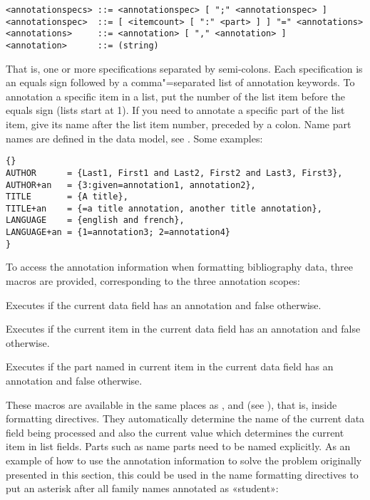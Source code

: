 \documentclass{ltxdockit}[2011/03/25]
\begin{document}
\begin{lstlisting}
<annotationspecs> ::= <annotationspec> [ ";" <annotationspec> ]
<annotationspec>  ::= [ <itemcount> [ ":" <part> ] ] "=" <annotations>
<annotations>     ::= <annotation> [ "," <annotation> ]
<annotation>      ::= (string)
\end{lstlisting}
%
That is, one or more specifications separated by semi-colons. Each specification is an equals sign followed by a comma"=separated list of annotation keywords. To annotation a specific item in a list, put the number of the list item before the equals sign (lists start at 1). If you need to annotate a specific part of the list item, give its name after the list item number, preceded by a colon. Name part names are defined in the data model, see . Some examples:

\begin{lstlisting}[style=bibtex]{}
AUTHOR      = {Last1, First1 and Last2, First2 and Last3, First3},
AUTHOR+an   = {3:given=annotation1, annotation2},
TITLE       = {A title},
TITLE+an    = {=a title annotation, another title annotation},
LANGUAGE    = {english and french},
LANGUAGE+an = {1=annotation3; 2=annotation4}
}
\end{lstlisting}
%
To access the annotation information when formatting bibliography data, three macros are provided, corresponding to the three annotation scopes:

\begin{ltxsyntax}


Executes  if the current data field has an annotation  and false otherwise.


Executes  if the current item in the current data field has an annotation  and false otherwise.


Executes  if the part named  in current item in the current data field has an annotation  and false otherwise.

\end{ltxsyntax}
%
These macros are available in the same places as ,  and  (see ), that is, inside formatting directives. They automatically determine the name of the current data field being processed and also the current  value which determines the current item in list fields. Parts such as name parts need to be named explicitly. As an example of how to use the annotation information to solve the problem originally presented in this section, this could be used in the name formatting directives to put an asterisk after all family names annotated as «student»:
\end{document}
